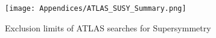 \begin{figure}[!ht]
\texttt{[image: Appendices/ATLAS\_SUSY\_Summary.png]}
\caption{Exclusion limits of ATLAS searches for Supersymmetry \citep{SUSYlimits}}
\label{fig:SUSYlimit}
\end{figure}